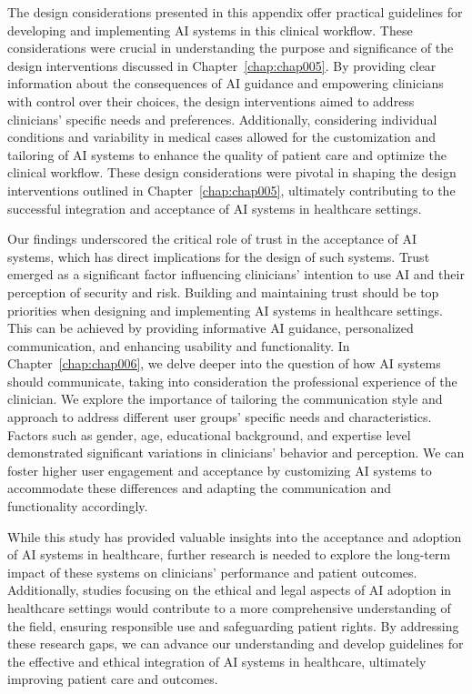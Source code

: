 The design considerations presented in this appendix offer practical guidelines for developing and implementing \ac{AI} systems in this clinical workflow.
These considerations were crucial in understanding the purpose and significance of the design interventions discussed in Chapter~\ref{chap:chap005}.
By providing clear information about the consequences of \ac{AI} guidance and empowering clinicians with control over their choices, the design interventions aimed to address clinicians' specific needs and preferences.
Additionally, considering individual conditions and variability in medical cases allowed for the customization and tailoring of \ac{AI} systems to enhance the quality of patient care and optimize the clinical workflow.
These design considerations were pivotal in shaping the design interventions outlined in Chapter~\ref{chap:chap005}, ultimately contributing to the successful integration and acceptance of \ac{AI} systems in healthcare settings.

Our findings underscored the critical role of trust in the acceptance of \ac{AI} systems, which has direct implications for the design of such systems.
Trust emerged as a significant factor influencing clinicians' intention to use \ac{AI} and their perception of security and risk.
Building and maintaining trust should be top priorities when designing and implementing \ac{AI} systems in healthcare settings.
This can be achieved by providing informative \ac{AI} guidance, personalized communication, and enhancing usability and functionality.
In Chapter~\ref{chap:chap006}, we delve deeper into the question of how \ac{AI} systems should communicate, taking into consideration the professional experience of the clinician.
We explore the importance of tailoring the communication style and approach to address different user groups' specific needs and characteristics.
Factors such as gender, age, educational background, and expertise level demonstrated significant variations in clinicians' behavior and perception.
We can foster higher user engagement and acceptance by customizing \ac{AI} systems to accommodate these differences and adapting the communication and functionality accordingly.

While this study has provided valuable insights into the acceptance and adoption of \ac{AI} systems in healthcare, further research is needed to explore the long-term impact of these systems on clinicians' performance and patient outcomes.
Additionally, studies focusing on the ethical and legal aspects of \ac{AI} adoption in healthcare settings would contribute to a more comprehensive understanding of the field, ensuring responsible use and safeguarding patient rights.
By addressing these research gaps, we can advance our understanding and develop guidelines for the effective and ethical integration of \ac{AI} systems in healthcare, ultimately improving patient care and outcomes.

